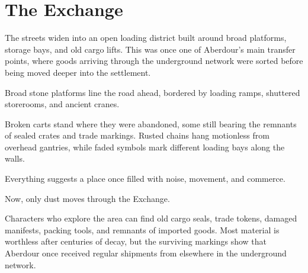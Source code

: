 \section*{ The Exchange}
{\entryfont The streets widen into an open loading district built around broad platforms, storage bays, and old cargo lifts. This was once one of Aberdour's main transfer points, where goods arriving through the underground network were sorted before being moved deeper into the settlement.}
\begin{DndReadAloud}
	Broad stone platforms line the road ahead, bordered by loading ramps, shuttered storerooms, and ancient cranes.

	Broken carts stand where they were abandoned, some still bearing the remnants of sealed crates and trade markings. Rusted chains hang motionless from overhead gantries, while faded symbols mark different loading bays along the walls.

	Everything suggests a place once filled with noise, movement, and commerce.

	Now, only dust moves through the Exchange.
\end{DndReadAloud}
{\noindent\entryfont Characters who explore the area can find old cargo seals, trade tokens, damaged manifests, packing tools, and remnants of imported goods. Most material is worthless after centuries of decay, but the surviving markings show that Aberdour once received regular shipments from elsewhere in the underground network.}